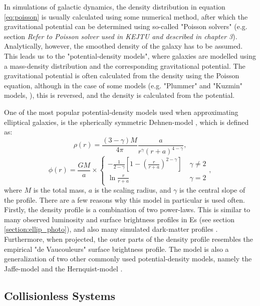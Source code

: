 \documentclass[english, oneside]{HYgradu}
\begin{document}
In simulations of galactic dynamics, the density distribution in equation \ref{eq:poisson} is usually calculated using some numerical method, after which the gravitational potential can be determined using so-called "Poisson solvers" (e.g. section \textit{Refer to Poisson solver used in KEJTU and described in chapter 3}). Analytically, however, the smoothed density of the galaxy has to be assumed. This leads us to the "potential-density models", where galaxies are modelled using a mass-density distribution and the corresponding gravitational potential. The gravitational potential is often calculated from the density using the Poisson equation, although in the case of some models (e.g. "Plummer" and "Kuzmin" models, \citealt{BinneyTremaine}), this is reversed, and the density is calculated from the potential.

One of the most popular potential-density models used when approximating elliptical galaxies, is the spherically symmetric Dehnen-model \citep{Dehnen1993}, which is defined as:
\begin{equation}
\rho(r) = \frac{(3-\gamma)M}{4\pi} \frac{a}{r^\gamma (r+a)^{4-\gamma}}, \label{eq:dehnen_density}
\end{equation}
\begin{equation}
\phi(r) = \frac{GM}{a} \times 
\begin{cases}
	-\frac{1}{2-\gamma} \left[ 1 - \left( \frac{r}{r+a} \right)^{2-\gamma} \right] & \; \gamma \neq 2 \\
	\ln \frac{r}{r+a}	 & \; \gamma = 2
\end{cases},
\label{eq:dehnen_potential}
\end{equation}
where $M$ is the total mass, $a$ is the scaling radius, and $\gamma$ is the central slope of the profile. There are a few reasons why this model in particular is used often. Firstly, the density profile is a combination of two power-laws. This is similar to many observed luminosity and surface brightness profiles in Es (see section \ref{section:ellip_photo}), and also many simulated dark-matter profiles \citep{BinneyTremaine}. Furthermore, when projected, the outer parts of the density profile resembles the empirical "de Vaucouleurs" surface brightness profile. The model is also a generalization of two other commonly used potential-density models, namely the Jaffe-model and the Hernquist-model \citep[for these models $\gamma = 2$ and $\gamma = 1$ respectively][]{Jaffe1983, Hernquist1990}. 

\subsection{Collisionless Systems}
\end{document}

